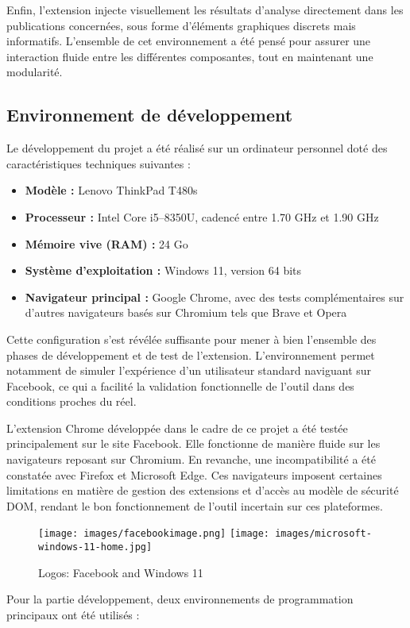 Enfin, l'extension injecte visuellement les résultats d'analyse directement dans les publications concernées, sous forme d'éléments graphiques discrets mais informatifs. L'ensemble de cet environnement a été pensé pour assurer une interaction fluide entre les différentes composantes, tout en maintenant une modularité.
\subsection{Environnement de développement}
Le développement du projet a été réalisé sur un ordinateur personnel doté des caractéristiques techniques suivantes :

\begin{itemize}
    \item \textbf{Modèle :} Lenovo ThinkPad T480s
    \item \textbf{Processeur :} Intel Core i5–8350U, cadencé entre 1.70 GHz et 1.90 GHz
    \item \textbf{Mémoire vive (RAM) :} 24 Go
    \item \textbf{Système d'exploitation :} Windows 11, version 64 bits
    \item \textbf{Navigateur principal :} Google Chrome, avec des tests complémentaires sur d'autres navigateurs basés sur Chromium tels que Brave et Opera
\end{itemize}
Cette configuration s'est révélée suffisante pour mener à bien l'ensemble des phases de développement et de test de l'extension. L'environnement permet notamment de simuler l'expérience d'un utilisateur standard naviguant sur Facebook, ce qui a facilité la validation fonctionnelle de l'outil dans des conditions proches du réel.

L'extension Chrome développée dans le cadre de ce projet a été testée principalement sur le site Facebook. Elle fonctionne de manière fluide sur les navigateurs reposant sur Chromium. En revanche, une incompatibilité a été constatée avec Firefox et Microsoft Edge. Ces navigateurs imposent certaines limitations en matière de gestion des extensions et d'accès au modèle de sécurité DOM, rendant le bon fonctionnement de l'outil incertain sur ces plateformes.
\begin{figure}[H]
    \centering
    \texttt{[image: images/facebookimage.png]} %
    \hfill %
    \texttt{[image: images/microsoft-windows-11-home.jpg]} %
    \caption{Logos: Facebook and Windows 11} %
    \label{fig:logos} %
\end{figure}
Pour la partie développement, deux environnements de programmation principaux ont été utilisés :


